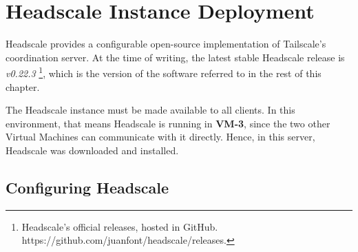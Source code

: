 \documentclass[11pt,twoside,a4paper]{report}
\begin{document}
\begin{table}[]
\centering
{}
\caption{Development Virtual Machines specification}
\label{table:vmspecs}
\end{table}

\section{Headscale Instance Deployment}
\label{sec:devhs}

Headscale provides a configurable open-source implementation of Tailscale's coordination server. At the time of writing, the latest stable Headscale release is \emph{v0.22.3} \footnote{Headscale's official releases, hosted in GitHub. https://github.com/juanfont/headscale/releases.}, which is the version of the software referred to in the rest of this chapter.

The Headscale instance must be made available to all clients. In this environment, that means Headscale is running in \textbf{VM-3}, since the two other Virtual Machines can communicate with it directly. Hence, in this server, Headscale was downloaded and installed.

\subsection{Configuring Headscale}
\end{document}
